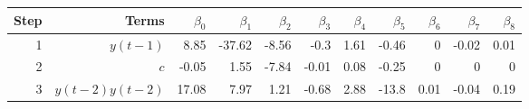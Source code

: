 \begin{tabular}{rrrrrrrrrrr}
Step & Terms & $\beta_{0}$ & $\beta_{1}$ & $\beta_{2}$ & $\beta_{3}$ & $\beta_{4}$ & $\beta_{5}$ & $\beta_{6}$ & $\beta_{7}$ & $\beta_{8}$ \\ 
\hline 
1 & $y(t-1)$ & 8.85 & -37.62 & -8.56 & -0.3 & 1.61 & -0.46 & 0 & -0.02 & 0.01 \\ 
2 & $c$ & -0.05 & 1.55 & -7.84 & -0.01 & 0.08 & -0.25 & 0 & 0 & 0 \\ 
3 & $y(t-2)y(t-2)$ & 17.08 & 7.97 & 1.21 & -0.68 & 2.88 & -13.8 & 0.01 & -0.04 & 0.19 \\ 
\hline 
\end{tabular}